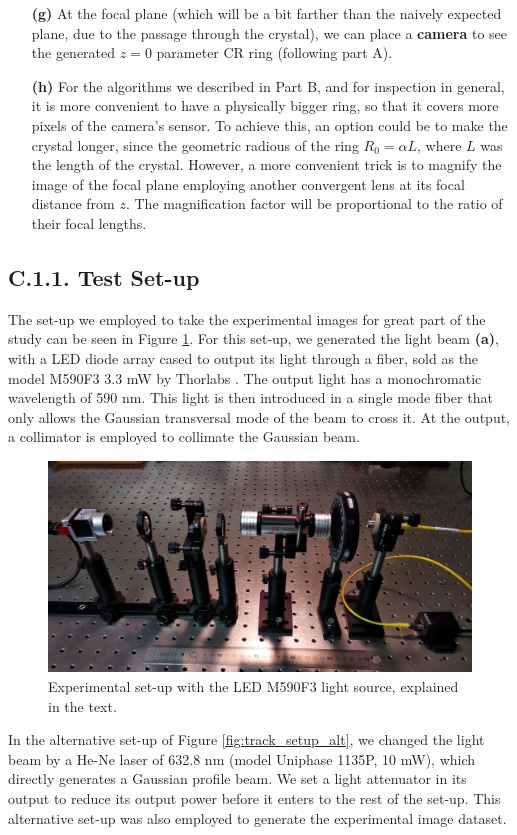 \documentclass[11pt, a4paper, twoside]{article} %
\begin{document}
\begin{itemize}
\item[\bf (g)] At the focal plane (which will be a bit farther than the naively expected plane, due to the passage through the crystal), we can place a {\bf camera} to see the generated $z=0$ parameter CR ring (following part A).

\item[\bf (h)] For the algorithms we described in Part B, and for inspection in general, it is more convenient to have a physically bigger ring, so that it covers more pixels of the camera's sensor. To achieve this, an option could be to make the crystal longer, since the geometric radious of the ring $R_0=\alpha L$, where $L$ was the length of the crystal. However, a more convenient trick is to magnify the image of the focal plane employing another convergent lens at its focal distance from $z$. The magnification factor will be proportional to the ratio of their focal lengths.
\end{itemize}

\subsection*{C.1.1. Test Set-up}

The set-up we employed to take the experimental images for great part of the study can be seen in Figure \ref{fig:track_setup}. For this set-up, we generated the light beam {\bf (a)}, with a LED diode array cased to output its light through a fiber, sold as the model M590F3 3.3 mW by Thorlabs \cite{thorlabs}. The output light has a monochromatic wavelength of 590 nm. This light is then introduced in a single mode fiber that only allows the Gaussian transversal mode of the beam to cross it. At the output, a collimator is employed to collimate the Gaussian beam.

\begin{figure}[h!] 
     \centering 
    \includegraphics[width=0.5\linewidth]{setup.jpg}
    \caption{ Experimental set-up with the LED M590F3 light source, explained in the text.  }
    \label{fig:track_setup}
\end{figure}


In the alternative set-up of Figure \ref{fig:track_setup_alt}, we changed the light beam by a He-Ne laser of 632.8 nm (model Uniphase 1135P, 10 mW), which directly generates a Gaussian profile beam. We set a light attenuator in its output to reduce its output power before it enters to the rest of the set-up. This alternative set-up was also employed to generate the experimental image dataset.
\end{document}
